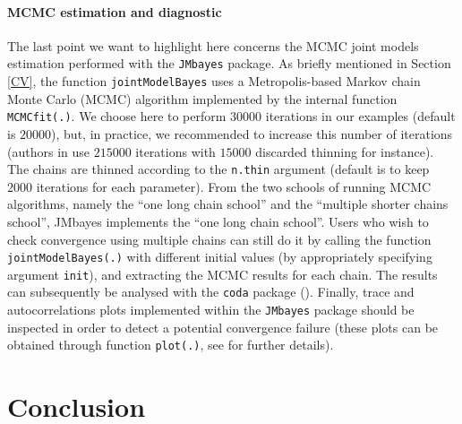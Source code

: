 \documentclass[12pt]{article}
\begin{document}
\paragraph{MCMC estimation and diagnostic}
The last point we want to highlight here concerns the MCMC joint models estimation performed with the \texttt{JMbayes} package. As briefly mentioned in Section \ref{CV}, the function \texttt{jointModelBayes} uses a Metropolis-based Markov chain Monte Carlo (MCMC) algorithm implemented by the internal function \texttt{MCMCfit(.)}.
We choose here to perform $30000$ iterations in our examples (default is $20000$), but, in practice, we recommended to increase this number of iterations (authors in \cite{Rizopoulos_JASA} use $215000$ iterations with $15000$ discarded thinning for instance). The chains are thinned according to the \texttt{n.thin} argument (default is to keep $2000$ iterations for each parameter).
From the two schools of running MCMC algorithms, namely the ``one long chain school'' and the ``multiple shorter chains school'', JMbayes implements the ``one long chain school''. Users who wish to check convergence using multiple chains can still do it by calling the function \texttt{jointModelBayes(.)} with different initial values (by appropriately specifying argument \texttt{init}), and extracting the MCMC results for each chain. The results can subsequently
be analysed with the \texttt{coda} package (\cite{coda}). Finally, trace and autocorrelations plots implemented within the \texttt{JMbayes} package should be inspected in order to detect a potential convergence failure (these plots can be obtained through function \texttt{plot(.)}, see \cite{JMbayes} for further details).

\section{Conclusion}
\end{document}
